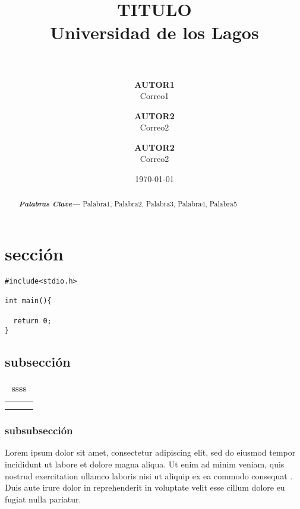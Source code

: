 \documentclass[letter,12pt]{article}
\providecommand{\keywords}[1]{\textbf{\textit{Palabras Clave---}} #1}
\begin{document}
\title{\vspace{-2cm}\textbf{TITULO}\\{\large Universidad de los Lagos}\\\vspace{-3mm}{\large Departamento de Ciencias Exactas}\\\vspace{-3mm}{\large Ingeniería Civil en Inform\'atica}} 
\author {\textbf{AUTOR1}\\Correo1
\and
\textbf{AUTOR2}\\Correo2
\and
\textbf{AUTOR2}\\Correo2
}
\date{\today}

\maketitle

\begin{abstract}
\blindtext %

\keywords{Palabra1, Palabra2, Palabra3, Palabra4, Palabra5}
\end{abstract}


\section{secci\'on}


\begin{lstlisting}
#include<stdio.h>

int main(){

  return 0;
}
\end{lstlisting}


\subsection{subsecci\'on}


\begin{table}
\begin{center}
  \begin{tabular}{l|cc}
  & & \\
  \hline
  & & \\
  & &
\end{tabular}
\end{center}
  \caption{ssss}
  \label{T:cuadro1}
\end{table}



\subsubsection{subsubsecci\'on}
Lorem ipsum dolor sit amet, consectetur adipiscing elit, sed do eiusmod tempor incididunt ut labore et dolore magna aliqua. Ut enim ad minim veniam, quis nostrud exercitation ullamco laboris nisi ut aliquip ex ea commodo consequat\cite{001,002} . Duis aute irure dolor in reprehenderit in voluptate velit esse cillum dolore eu fugiat nulla pariatur. 
\end{document}
